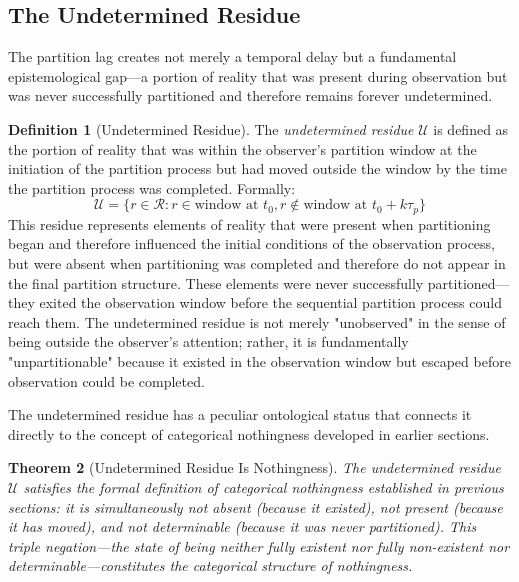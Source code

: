 \documentclass[12pt,a4paper]{article}
\newtheorem{theorem}{Theorem}[section]
\theoremstyle{definition}
\newtheorem{definition}[theorem]{Definition}
\theoremstyle{remark}
\begin{document}
\subsection{The Undetermined Residue}

The partition lag creates not merely a temporal delay but a fundamental epistemological gap—a portion of reality that was present during observation but was never successfully partitioned and therefore remains forever undetermined.

\begin{definition}[Undetermined Residue]
\label{def:undetermined_residue}
The \emph{undetermined residue} $\mathcal{U}$ is defined as the portion of reality that was within the observer's partition window at the initiation of the partition process but had moved outside the window by the time the partition process was completed. Formally:
\begin{equation}
    \mathcal{U} = \{r \in \mathcal{R} : r \in \text{window at } t_0, r \notin \text{window at } t_0 + k\tau_p\}
\end{equation}
This residue represents elements of reality that were present when partitioning began and therefore influenced the initial conditions of the observation process, but were absent when partitioning was completed and therefore do not appear in the final partition structure. These elements were never successfully partitioned—they exited the observation window before the sequential partition process could reach them. The undetermined residue is not merely "unobserved" in the sense of being outside the observer's attention; rather, it is fundamentally "unpartitionable" because it existed in the observation window but escaped before observation could be completed.
\end{definition}

The undetermined residue has a peculiar ontological status that connects it directly to the concept of categorical nothingness developed in earlier sections.

\begin{theorem}[Undetermined Residue Is Nothingness]
\label{thm:residue_nothingness}
The undetermined residue $\mathcal{U}$ satisfies the formal definition of categorical nothingness established in previous sections: it is simultaneously not absent (because it existed), not present (because it has moved), and not determinable (because it was never partitioned). This triple negation—the state of being neither fully existent nor fully non-existent nor determinable—constitutes the categorical structure of nothingness.
\end{theorem}
\end{document}
